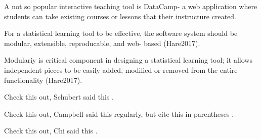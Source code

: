 \documentclass{tise_style}
\begin{document}
A not so popular interactive teaching tool is DataCamp- a web application where students can take existing courses or lessons 
that their instructure created.


For a statistical learning tool to be effective, the software system should be modular, extensible, reproducable, and web-
based (Hare2017). 

Modulariy is critical component in designing a statistical learning tool; it allows independent pieces to be easily added, modified or removed from the entire functionality (Hare2017). 


Check this out, Schubert said this \cite{Schubert13}.


Check this out, Campbell said this \cite{Campbell02} regularly, but cite this in parentheses \citep{Campbell02}.


Check this out, Chi said this \cite{Chi81}.




\end{document}
